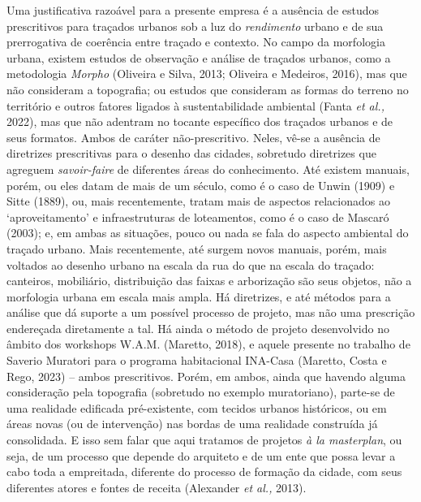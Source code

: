 \documentclass[12pt, a4paper]{book} %
\begin{document}
        Uma justificativa razoável para a presente empresa é a ausência de estudos prescritivos para traçados urbanos sob a luz do \textit{rendimento} urbano e de sua prerrogativa de coerência entre traçado e contexto. No campo da morfologia urbana, existem estudos de observação e análise de traçados urbanos, como a metodologia \textit{Morpho} (Oliveira e Silva, 2013; Oliveira e Medeiros, 2016), mas que não consideram a topografia; ou estudos que consideram as formas do terreno no território e outros fatores ligados à sustentabilidade ambiental (Fanta \textit{et al.,} 2022), mas que não adentram no tocante específico dos traçados urbanos e de seus formatos. Ambos de caráter não-prescritivo. Neles, vê-se a ausência de diretrizes prescritivas para o desenho das cidades, sobretudo diretrizes que agreguem \textit{savoir-faire} de diferentes áreas do conhecimento. Até existem manuais, porém, ou eles datam de mais de um século, como é o caso de Unwin (1909) e Sitte (1889), ou, mais recentemente, tratam mais de aspectos relacionados ao `aproveitamento' e infraestruturas de loteamentos, como é o caso de Mascaró (2003); e, em ambas as situações, pouco ou nada se fala do aspecto ambiental do traçado urbano. Mais recentemente, até surgem novos manuais, porém, mais voltados ao desenho urbano na escala da rua do que na escala do traçado: canteiros, mobiliário, distribuição das faixas e arborização são seus objetos, não a morfologia urbana em escala mais ampla. Há diretrizes, e até métodos para a análise que dá suporte a um possível processo de projeto, mas não uma prescrição endereçada diretamente a tal. Há ainda o método de projeto desenvolvido no âmbito dos workshops W.A.M. (Maretto, 2018), e aquele presente no trabalho de Saverio Muratori para o programa habitacional INA-Casa (Maretto, Costa e Rego, 2023) – ambos prescritivos. Porém, em ambos, ainda que havendo alguma consideração pela topografia (sobretudo no exemplo muratoriano), parte-se de uma realidade edificada pré-existente, com tecidos urbanos históricos, ou em áreas novas (ou de intervenção) nas bordas de uma realidade construída já consolidada. E isso sem falar que aqui tratamos de projetos \textit{à la masterplan}, ou seja, de um processo que depende do arquiteto e de um ente que possa levar a cabo toda a empreitada, diferente do processo de formação da cidade, com seus diferentes atores e fontes de receita (Alexander \textit{et al.,} 2013).
\end{document}
